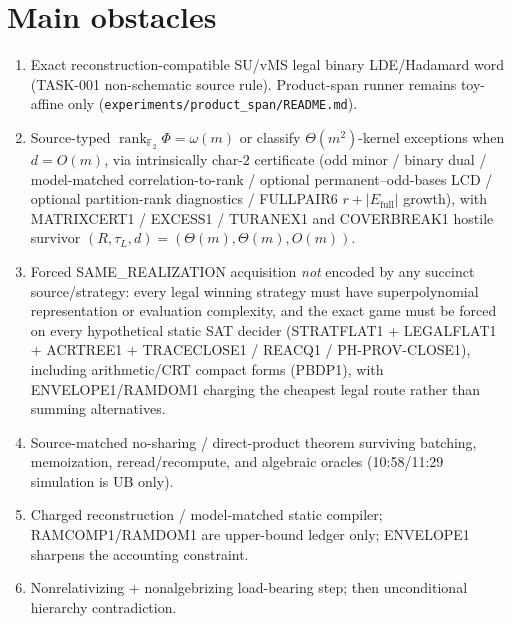 \documentclass[11pt]{article}
\begin{document}
\section*{Main obstacles}
\begin{enumerate}
\item Exact reconstruction-compatible SU/vMS legal binary LDE/Hadamard word
(TASK-001 non-schematic source rule). Product-span runner remains toy-affine only
(\texttt{experiments/product\_span/README.md}).
\item Source-typed $\operatorname{rank}_{\mathbb F_2}\Phi=\omega(m)$ or classify
$\Theta(m^2)$-kernel exceptions when $d=O(m)$, via intrinsically char-$2$
certificate (odd minor / binary dual / model-matched correlation-to-rank /
optional permanent--odd-bases LCD / optional partition-rank diagnostics /
FULLPAIR6 $r+|E_{\mathrm{full}}|$ growth), with MATRIXCERT1 / EXCESS1 / TURANEX1
and COVERBREAK1 hostile survivor $(R,\tau_L,d)=(\Theta(m),\Theta(m),O(m))$.
\item Forced SAME\_REALIZATION acquisition \emph{not} encoded by any succinct
source/strategy: every legal winning strategy must have superpolynomial
representation or evaluation complexity, and the exact game must be forced on
every hypothetical static SAT decider (STRATFLAT1 + LEGALFLAT1 + ACRTREE1 +
TRACECLOSE1 / REACQ1 / PH-PROV-CLOSE1), including arithmetic/CRT compact forms
(PBDP1), with ENVELOPE1/RAMDOM1 charging the cheapest legal route rather than
summing alternatives.
\item Source-matched no-sharing / direct-product theorem surviving batching,
memoization, reread/recompute, and algebraic oracles (10:58/11:29 simulation is
UB only).
\item Charged reconstruction / model-matched static compiler; RAMCOMP1/RAMDOM1 are
upper-bound ledger only; ENVELOPE1 sharpens the accounting constraint.
\item Nonrelativizing + nonalgebrizing load-bearing step; then unconditional
hierarchy contradiction.
\end{enumerate}
\end{document}
